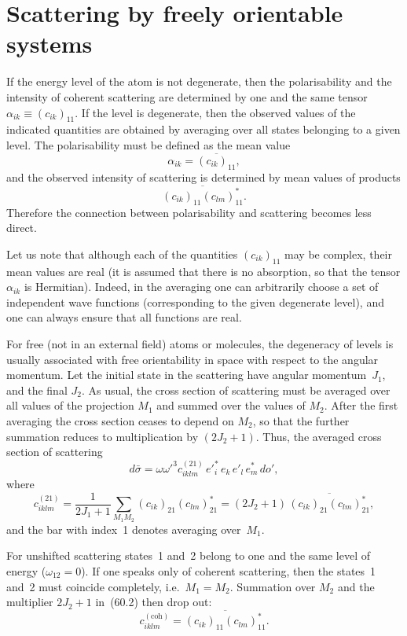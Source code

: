 \section{Scattering by freely orientable systems}

If the energy level of the atom is not degenerate, then the polarisability and the intensity of coherent scattering are determined by one and the same tensor $\alpha_{ik} \equiv (c_{ik})_{11}$. If the level is degenerate, then the observed values of the indicated quantities are obtained by averaging over all states belonging to a given level. The polarisability must be defined as the mean value
\[
\alpha_{ik} = \overline{(c_{ik})_{11}},
\]
and the observed intensity of scattering is determined by mean values of products
\[
\overline{(c_{ik})_{11}(c_{lm})^*_{11}}.
\]
Therefore the connection between polarisability and scattering becomes less direct.

Let us note that although each of the quantities $(c_{ik})_{11}$ may be complex, their mean values are real (it is assumed that there is no absorption, so that the tensor $\alpha_{ik}$ is Hermitian). Indeed, in the averaging one can arbitrarily choose a set of independent wave functions (corresponding to the given degenerate level), and one can always ensure that all functions are real.

For free (not in an external field) atoms or molecules, the degeneracy of levels is usually associated with free orientability in space with respect to the angular momentum. Let the initial state in the scattering have angular momentum~$J_1$, and the final $J_2$. As usual, the cross section of scattering must be averaged over all values of the projection $M_1$ and summed over the values of $M_2$. After the first averaging the cross section ceases to depend on $M_2$, so that the further summation reduces to multiplication by $(2J_2 + 1)$. Thus, the averaged cross section of scattering
\begin{equation}
d\bar{\sigma} = \omega\omega'^3 c^{(21)}_{iklm}\,e'^*_i\,e_k\,e'_l\,e^*_m\,do',
\tag{60.1}
\end{equation}
where
\begin{equation}
c^{(21)}_{iklm} = \frac{1}{2J_1 + 1}\sum_{M_1 M_2}(c_{ik})_{21}(c_{lm})^*_{21} = (2J_2 + 1)\,\overline{(c_{ik})_{21}(c_{lm})^*_{21}},
\tag{60.2}
\end{equation}
and the bar with index~1 denotes averaging over~$M_1$.

For unshifted scattering states~1 and~2 belong to one and the same level of energy ($\omega_{12} = 0$). If one speaks only of coherent scattering, then the states~1 and~2 must coincide completely, i.e.\ $M_1 = M_2$. Summation over $M_2$ and the multiplier $2J_2 + 1$ in~(60.2) then drop out:
\begin{equation}
c^{(\mathrm{coh})}_{iklm} = \overline{(c_{ik})_{11}(c_{lm})^*_{11}}.
\tag{60.3}
\end{equation}

